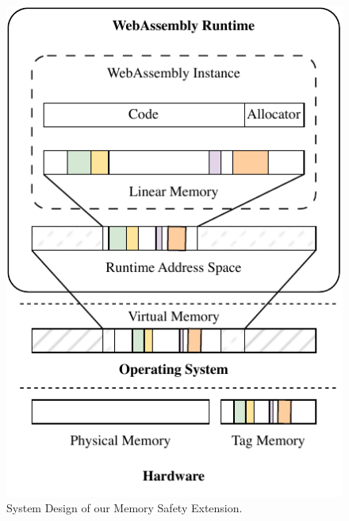 \begin{figure}[t]
    \centering
    \includegraphics[scale=1]{figures/build/system-design-2}
    \caption{System Design of our Memory Safety Extension.}
    \label{fig:system-design-2}
\end{figure}

